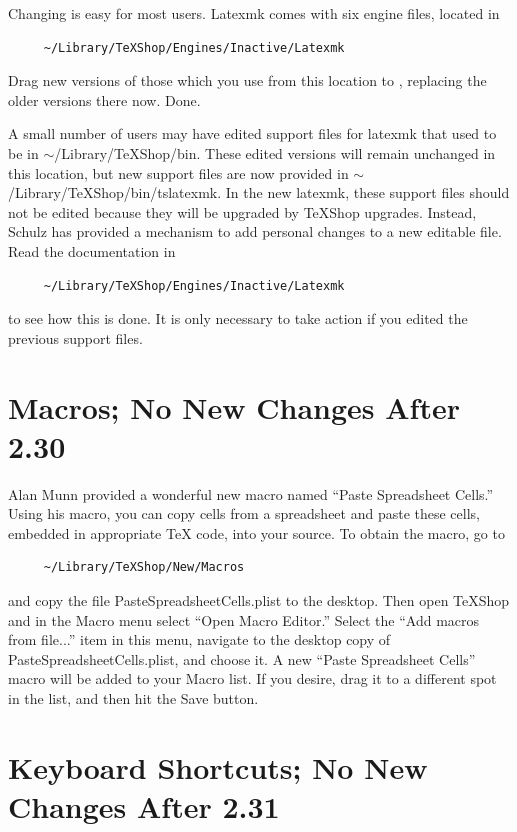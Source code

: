 \documentclass[11pt, oneside]{amsart}
\begin{document}
Changing is easy for most users. Latexmk comes with six engine files, located in 
\begin{verbatim}
     ~/Library/TeXShop/Engines/Inactive/Latexmk
\end{verbatim}
Drag new versions of those which you use from this location to , replacing the older versions there now. Done.

A small number of users may have edited support files  for latexmk that used to be in $\sim$/Library/TeXShop/bin. These edited versions will remain unchanged in this location, but new support files are now provided in $\sim$/Library/TeXShop/bin/tslatexmk. In the new latexmk, these support files should not be edited because they will be upgraded by TeXShop upgrades. Instead, Schulz has provided a mechanism to add personal changes to a new editable file. Read the documentation in 
\begin{verbatim}
     ~/Library/TeXShop/Engines/Inactive/Latexmk
\end{verbatim}
to see how this is done. It is only necessary to take action if you edited the previous support files.

\section{Macros; No New Changes After 2.30}

Alan Munn provided a wonderful new macro named ``Paste Spreadsheet Cells.'' Using his macro, you can copy cells from a spreadsheet and paste these cells, embedded in appropriate TeX code, into your source. To obtain the macro, go to
\begin{verbatim}
     ~/Library/TeXShop/New/Macros
\end{verbatim}
and copy the file PasteSpreadsheetCells.plist to the desktop. Then open TeXShop and in the Macro menu select ``Open Macro Editor.'' Select the ``Add macros from file...'' item in this menu, navigate to the desktop copy of PasteSpreadsheetCells.plist, and choose it. A new ``Paste Spreadsheet Cells'' macro will be added to your Macro list. If you desire, drag it to a different spot in the list, and then hit the Save button.

\section{Keyboard Shortcuts; No New Changes After 2.31}
\end{document}
